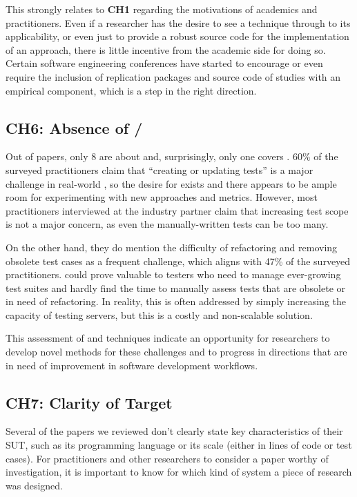 This strongly relates to \textbf{CH1} regarding the motivations of academics and practitioners.
Even if a researcher has the desire to see a technique through to its applicability, or even just to provide a robust source code for the implementation of an approach, there is little incentive from the academic side for doing so.
Certain software engineering conferences have started to encourage or even require the inclusion of replication packages and source code of studies with an empirical component, which is a step in the right direction.


\subsection{CH6: Absence of \tsr/\tsa}
Out of \numpapers papers, only 8 are about \tsr and, surprisingly, only one covers \tsa 
 .
60\% of the surveyed practitioners claim that ``creating or updating tests'' is a major challenge in real-world \rt, so the desire for \tsa exists and there appears to be ample room for experimenting with new approaches and metrics.
However, most practitioners interviewed at the industry partner claim that increasing test scope is not a major concern, as even the manually-written tests can be too many.

On the other hand, they do mention the difficulty of refactoring and removing obsolete test cases as a frequent challenge, which aligns with 47\% of the surveyed practitioners.
\tsr could prove valuable to testers who need to manage ever-growing test suites and hardly find the time to manually assess tests that are obsolete or in need of refactoring.
In reality, this is often addressed by simply increasing the capacity of testing servers, but this is a costly and non-scalable solution.

This assessment of \tsr and \tsa techniques indicate an opportunity for researchers to develop novel methods for these challenges and to progress in directions that are in need of improvement in software development workflows.

\subsection{CH7: Clarity of Target}
Several of the papers we reviewed don't clearly state key characteristics of their SUT, such as its programming language or its scale (either in lines of code or test cases).
For practitioners and other researchers to consider a paper worthy of investigation, it is important to know for which kind of system a piece of research was designed.

